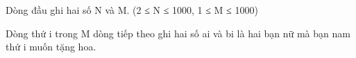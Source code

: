 Dòng đầu ghi hai số N và M. (2 ≤ N ≤ 1000, 1 ≤ M ≤ 1000)  

   Dòng thứ i trong M dòng tiếp theo ghi hai số ai và bi là hai bạn nữ mà bạn nam thứ i muốn tặng hoa.